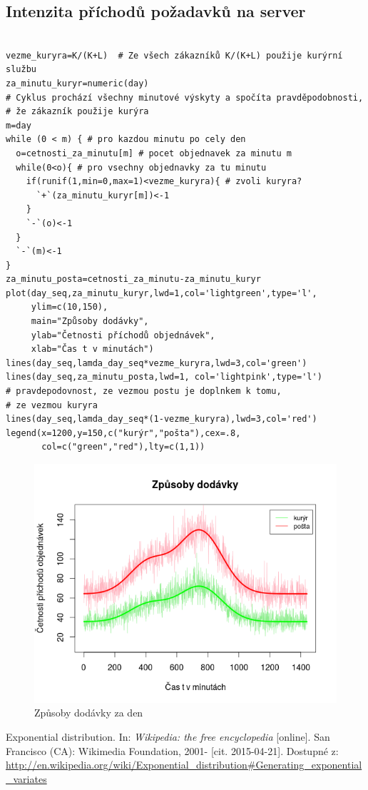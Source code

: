 \documentclass[12pt]{article}
\begin{document}
\subsection{Intenzita příchodů požadavků na server}
\begin{lstlisting}[frame=single]  % start your code-block

vezme_kuryra=K/(K+L)  # Ze všech zákazníků K/(K+L) použije kurýrní službu
za_minutu_kuryr=numeric(day) 
# Cyklus prochází všechny minutové výskyty a spočíta pravděpodobnosti,
# že zákazník použije kurýra
m=day
while (0 < m) { # pro kazdou minutu po cely den
  o=cetnosti_za_minutu[m] # pocet objednavek za minutu m
  while(0<o){ # pro vsechny objednavky za tu minutu
    if(runif(1,min=0,max=1)<vezme_kuryra){ # zvoli kuryra?
      `+`(za_minutu_kuryr[m])<-1
    }
    `-`(o)<-1
  }
  `-`(m)<-1
}
za_minutu_posta=cetnosti_za_minutu-za_minutu_kuryr
plot(day_seq,za_minutu_kuryr,lwd=1,col='lightgreen',type='l',
     ylim=c(10,150),
     main="Způsoby dodávky",
     ylab="Četnosti příchodů objednávek",
     xlab="Čas t v minutách")
lines(day_seq,lamda_day_seq*vezme_kuryra,lwd=3,col='green')
lines(day_seq,za_minutu_posta,lwd=1, col='lightpink',type='l')
# pravdepodovnost, ze vezmou postu je doplnkem k tomu,
# ze vezmou kuryra
lines(day_seq,lamda_day_seq*(1-vezme_kuryra),lwd=3,col='red')
legend(x=1200,y=150,c("kurýr","pošta"),cex=.8, 
       col=c("green","red"),lty=c(1,1))
\end{lstlisting}
\begin{figure}[ht!]
	\includegraphics[scale=0.6]{img/3_zpusoby_dodavky}\centering
	\caption{Způsoby dodávky za den}
	\label{obr:sikme}
\end{figure}

\begin{thebibliography}{1}

Exponential distribution. In: \textit{Wikipedia: the free encyclopedia} [online]. San Francisco (CA): Wikimedia Foundation, 2001- [cit. 2015-04-21]. Dostupné z: \url{http://en.wikipedia.org/wiki/Exponential_distribution\#Generating_exponential_variates}

\end{thebibliography}
\end{document}

